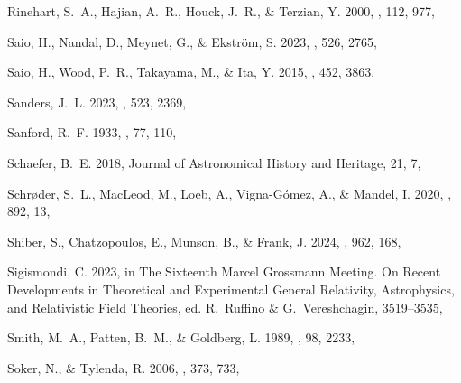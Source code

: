 \documentclass[twocolumn]{aastex631}
\begin{document}
\begin{thebibliography}{}
{Rinehart}, S.~A., {Hajian}, A.~R., {Houck}, J.~R., \& {Terzian}, Y. 2000,
  \pasp, 112, 977, 

{Saio}, H., {Nandal}, D., {Meynet}, G., \& {Ekstr{\"o}m}, S. 2023, \mnras, 526,
  2765, 

{Saio}, H., {Wood}, P.~R., {Takayama}, M., \& {Ita}, Y. 2015, \mnras, 452,
  3863, 

{Sanders}, J.~L. 2023, \mnras, 523, 2369, 

{Sanford}, R.~F. 1933, \apj, 77, 110, 

{Schaefer}, B.~E. 2018, Journal of Astronomical History and Heritage, 21, 7,

{Schr{\o}der}, S.~L., {MacLeod}, M., {Loeb}, A., {Vigna-G{\'o}mez}, A., \&
  {Mandel}, I. 2020, \apj, 892, 13, 

{Shiber}, S., {Chatzopoulos}, E., {Munson}, B., \& {Frank}, J. 2024, \apj, 962,
  168, 

{Sigismondi}, C. 2023, in The Sixteenth Marcel Grossmann Meeting. On Recent
  Developments in Theoretical and Experimental General Relativity,
  Astrophysics, and Relativistic Field Theories, ed. R.~{Ruffino} \&
  G.~{Vereshchagin}, 3519--3535, 

{Smith}, M.~A., {Patten}, B.~M., \& {Goldberg}, L. 1989, \aj, 98, 2233,

{Soker}, N., \& {Tylenda}, R. 2006, \mnras, 373, 733,


\end{thebibliography}
\end{document}
